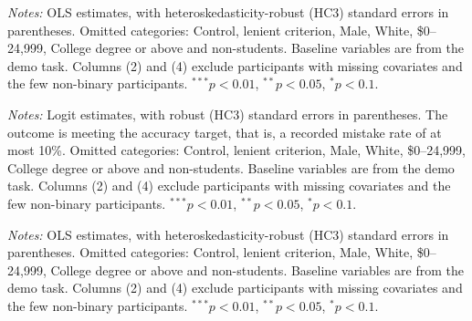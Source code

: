 \documentclass[12pt, letterpaper]{article}
\begin{document}
\begin{table}[p]
\centering
\begin{threeparttable}
\scriptsize\renewcommand{\arraystretch}{0.85}

\begin{tablenotes}[flushleft]
\scriptsize
\item \textit{Notes:} OLS estimates, with heteroskedasticity-robust (HC3) standard errors in parentheses. Omitted categories: Control, lenient criterion, Male, White, \$0--24,999, College degree or above and non-students. Baseline variables are from the demo task. Columns (2) and (4) exclude participants with missing covariates and the few non-binary participants. $^{***}p<0.01$, $^{**}p<0.05$, $^{*}p<0.1$.
\end{tablenotes}
\end{threeparttable}
\caption{Treatment effects on sets completed (pooled sample)}\label{tab:reg-sets-full}
\end{table}

\begin{table}[p]
\centering
\begin{threeparttable}
\scriptsize\renewcommand{\arraystretch}{0.85}

\begin{tablenotes}[flushleft]
\scriptsize
\item \textit{Notes:} Logit estimates, with robust (HC3) standard errors in parentheses. The outcome is meeting the accuracy target, that is, a recorded mistake rate of at most 10\%. Omitted categories: Control, lenient criterion, Male, White, \$0--24,999, College degree or above and non-students. Baseline variables are from the demo task. Columns (2) and (4) exclude participants with missing covariates and the few non-binary participants. $^{***}p<0.01$, $^{**}p<0.05$, $^{*}p<0.1$.
\end{tablenotes}
\end{threeparttable}
\caption{Treatment effects on accuracy target achievement likelihood (lab sample)}\label{tab:reg-target-lab}
\end{table}

\begin{table}[p]
\centering
\begin{threeparttable}
\scriptsize\renewcommand{\arraystretch}{0.85}

\begin{tablenotes}[flushleft]
\scriptsize
\item \textit{Notes:} OLS estimates, with heteroskedasticity-robust (HC3) standard errors in parentheses. Omitted categories: Control, lenient criterion, Male, White, \$0--24,999, College degree or above and non-students. Baseline variables are from the demo task. Columns (2) and (4) exclude participants with missing covariates and the few non-binary participants. $^{***}p<0.01$, $^{**}p<0.05$, $^{*}p<0.1$.
\end{tablenotes}
\end{threeparttable}
\caption{Treatment effects on mistake rate (lab sample)}\label{tab:reg-mistakes-lab}
\end{table}
\end{document}

